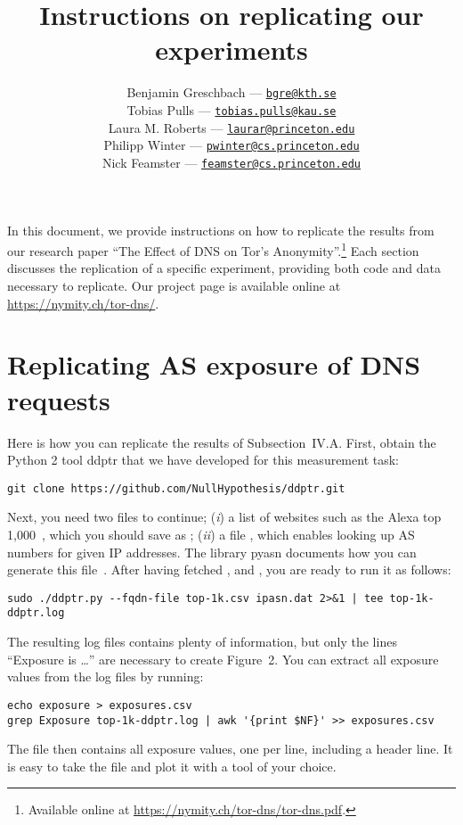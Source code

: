 \documentclass{article}
\title{Instructions on replicating our experiments}
\author{%
	Benjamin Greschbach --- \href{mailto:bgre@kth.se}{\nolinkurl{bgre@kth.se}} \\
	Tobias Pulls --- \href{mailto:tobias.pulls@kau.se}{\nolinkurl{tobias.pulls@kau.se}} \\
	Laura M. Roberts --- \href{mailto:laurar@princeton.edu}{\nolinkurl{laurar@princeton.edu}} \\
	Philipp Winter --- \href{mailto:pwinter@cs.princeton.edu}{\nolinkurl{pwinter@cs.princeton.edu}} \\
	Nick Feamster --- \href{mailto:feamster@cs.princeton.edu}{\nolinkurl{feamster@cs.princeton.edu}}
}
\newcommand{\first}{(\emph{i})\xspace}
\newcommand{\second}{(\emph{ii})\xspace}
\begin{document}
\maketitle

In this document, we provide instructions on how to replicate the results from
our research paper ``The Effect of DNS on Tor's Anonymity''.\footnote{Available
online at \url{https://nymity.ch/tor-dns/tor-dns.pdf}.} Each section discusses
the replication of a specific experiment, providing both code and data necessary
to replicate.  Our project page is available online at
\url{https://nymity.ch/tor-dns/}.

\tableofcontents

\newpage

\section{Replicating AS exposure of DNS requests}
Here is how you can replicate the results of Subsection~IV.A.  First, obtain the
Python 2 tool ddptr that we have developed for this measurement task:

\begin{lstlisting}
git clone https://github.com/NullHypothesis/ddptr.git
\end{lstlisting}

Next, you need two files to continue; \first a list of websites such as the
Alexa top 1,000~\cite{alexatop1k}, which you should save as ;
\second a file , which enables looking up AS numbers for given IP
addresses.  The library pyasn documents how you can generate this
file~\cite{pyasn}.  After having fetched ,  and
, you are ready to run it as follows:

\begin{lstlisting}
sudo ./ddptr.py --fqdn-file top-1k.csv ipasn.dat 2>&1 | tee top-1k-ddptr.log
\end{lstlisting}

The resulting log files contains plenty of information, but only the lines
``Exposure is \ldots'' are necessary to create Figure~2.  You can extract all
exposure values from the log files by running:

\begin{lstlisting}
echo exposure > exposures.csv
grep Exposure top-1k-ddptr.log | awk '{print $NF}' >> exposures.csv
\end{lstlisting}

The file  then contains all exposure values, one per line,
including a header line.  It is easy to take the file and plot it with a tool of
your choice.
\end{document}

